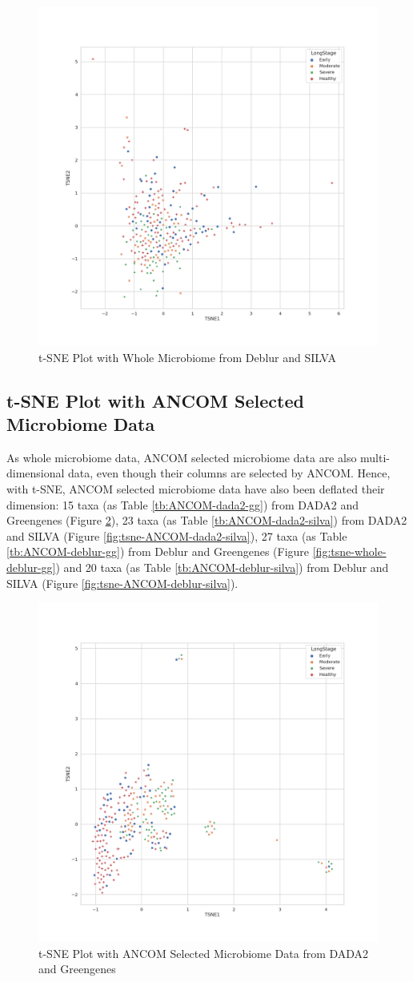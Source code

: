 \documentclass[a4paper]{article}
\begin{document}
            \begin{figure}[p]
                \centering
                \includegraphics[width=0.6 \linewidth]{figures/tSNE/Whole/whole.Deblur.silva.png}
                \caption{t-SNE Plot with Whole Microbiome from Deblur and SILVA}
                \label{fig:tsne-whole-deblur-silva}
            \end{figure}

        \subsection{t-SNE Plot with ANCOM Selected Microbiome Data}
            As whole microbiome data, ANCOM selected microbiome data are also multi-dimensional data, even though their columns are selected by ANCOM. Hence, with t-SNE, ANCOM selected microbiome data have also been deflated their dimension: 15 taxa (as Table \ref{tb:ANCOM-dada2-gg}) from DADA2 and Greengenes (Figure \ref{fig:tsne-ANCOM-dada2-gg}), 23 taxa (as Table \ref{tb:ANCOM-dada2-silva}) from DADA2 and SILVA (Figure \ref{fig:tsne-ANCOM-dada2-silva}), 27 taxa (as Table \ref{tb:ANCOM-deblur-gg}) from Deblur and Greengenes (Figure \ref{fig:tsne-whole-deblur-gg}) and 20 taxa (as Table \ref{tb:ANCOM-deblur-silva}) from Deblur and SILVA (Figure \ref{fig:tsne-ANCOM-deblur-silva}).

            \begin{figure}[p]
                \centering
                \includegraphics[width=0.6 \linewidth]{figures/tSNE/ANCOM/ANCOM.DADA2.gg.png}
                \caption{t-SNE Plot with ANCOM Selected Microbiome Data from DADA2 and Greengenes}
                \label{fig:tsne-ANCOM-dada2-gg}
            \end{figure}
\end{document}
